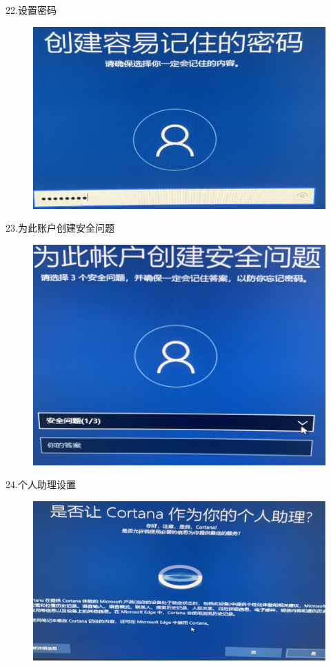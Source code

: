 \documentclass[openbib]{article}
\begin{document}
22.设置密码
\begin{figure}[htbp]
	\centering
	\includegraphics[scale=0.24]{c}
\end{figure}

23.为此账户创建安全问题
\begin{figure}[H]
	\centering
	\includegraphics[scale=0.2]{22}
\end{figure}

24.个人助理设置
\begin{figure}[H]
	\centering
	\includegraphics[scale=0.24]{23}
\end{figure}
\end{document}
